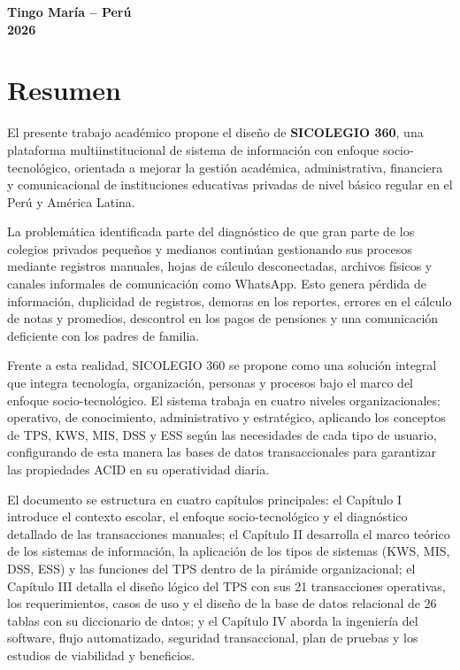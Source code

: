 \documentclass[12pt,a4paper,oneside]{report}
\begin{document}
\begin{titlepage}
\begin{center}
        \vfill
        
        {\fontsize{12}{14}\selectfont\textbf{Tingo María -- Perú}} \\[0.2cm]
        {\fontsize{12}{14}\selectfont\textbf{2026}}
    \end{center}
\end{titlepage}

\chapter*{Resumen}

El presente trabajo académico propone el diseño de \textbf{SICOLEGIO 360}, una plataforma multiinstitucional de sistema de información con enfoque socio-tecnológico, orientada a mejorar la gestión académica, administrativa, financiera y comunicacional de instituciones educativas privadas de nivel básico regular en el Perú y América Latina.

La problemática identificada parte del diagnóstico de que gran parte de los colegios privados pequeños y medianos continúan gestionando sus procesos mediante registros manuales, hojas de cálculo desconectadas, archivos físicos y canales informales de comunicación como WhatsApp. Esto genera pérdida de información, duplicidad de registros, demoras en los reportes, errores en el cálculo de notas y promedios, descontrol en los pagos de pensiones y una comunicación deficiente con los padres de familia.

Frente a esta realidad, SICOLEGIO 360 se propone como una solución integral que integra tecnología, organización, personas y procesos bajo el marco del enfoque socio-tecnológico. El sistema trabaja en cuatro niveles organizacionales: operativo, de conocimiento, administrativo y estratégico, aplicando los conceptos de TPS, KWS, MIS, DSS y ESS según las necesidades de cada tipo de usuario, configurando de esta manera las bases de datos transaccionales para garantizar las propiedades ACID en su operatividad diaria.

El documento se estructura en cuatro capítulos principales: el Capítulo I introduce el contexto escolar, el enfoque socio-tecnológico y el diagnóstico detallado de las transacciones manuales; el Capítulo II desarrolla el marco teórico de los sistemas de información, la aplicación de los tipos de sistemas (KWS, MIS, DSS, ESS) y las funciones del TPS dentro de la pirámide organizacional; el Capítulo III detalla el diseño lógico del TPS con sus 21 transacciones operativas, los requerimientos, casos de uso y el diseño de la base de datos relacional de 26 tablas con su diccionario de datos; y el Capítulo IV aborda la ingeniería del software, flujo automatizado, seguridad transaccional, plan de pruebas y los estudios de viabilidad y beneficios.
\end{document}

